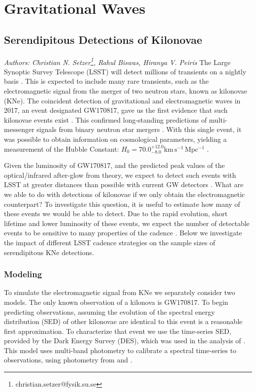 
\newcommand{\md}{\mathrm{d}}

\section{Gravitational Waves}

\subsection{Serendipitous Detections of Kilonovae}
\textit{Authors: Christian N. Setzer\footnote{christian.setzer@fysik.su.se}, Rahul Biswas, Hiranya V. Peiris}\newline
\newline
The Large Synoptic Survey Telescope (LSST) will detect millions of transients on a nightly basis \citep{LSSTScienceCollaboration2009}. This is expected to include many rare transients, such as the electromagnetic signal from the merger of two neutron stars, known as kilonovae (KNe). The coincident detection of gravitational and electromagnetic waves in 2017, an event designated GW170817, gave us the first evidence that such kilonovae events exist \citep{TheLIGOScientificCollaboration2017, Cowperthwaite2017}. This confirmed long-standing predictions of multi-messenger signals from binary neutron star mergers \citep{Li1998}. With this single event, it was possible to obtain information on cosmological parameters, yielding a measurement of the Hubble Constant: $H_0 = 70.0^{+12.0}_{-8.0} \mathrm{km\,s^{-1}\,Mpc^{-1}}$ \citep{Abbott2017}.

Given the luminosity of GW170817, and the predicted peak values of the optical/infrared after-glow from theory, we expect to detect such events with LSST at greater distances than possible with current GW detectors \citep{Chen2017a}. What are we able to do with detections of kilonovae if we only obtain the electromagnetic counterpart? To investigate this question, it is useful to estimate how many of these events we would be able to detect. Due to the rapid evolution, short lifetime and lower luminosity of these events, we expect the number of detectable events to be sensitive to many properties of the cadence \citep{LSSTScienceCollaboration2017}. Below we investigate the impact of different LSST cadence strategies on the sample sizes of serendipitous KNe detections.

\subsubsection{Modeling}
To simulate the electromagnetic signal from KNe we separately consider two models. The only known observation of a kilonova is GW170817. To begin predicting observations, assuming the evolution of the spectral energy distribution (SED) of other kilonovae are identical to this event is a reasonable first approximation. To characterize that event we use the time-series SED, provided by the Dark Energy Survey (DES), which was used in the analysis of \citet{Scolnic2017a}. This model uses multi-band photometry to calibrate a spectral time-series to observations, using photometry from \citet{Soares-Santos2017} and
\citet{Cowperthwaite2017}.

